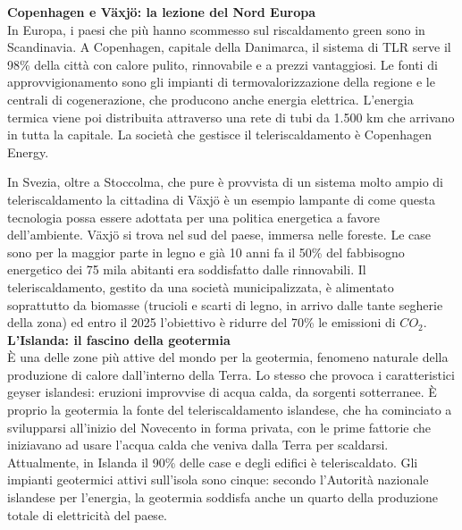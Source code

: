 \documentclass[laurea,oneside,11pt]{USiena_tesiLM}
\begin{document}
\noindent\textbf{Copenhagen e Växjö: la lezione del Nord Europa}\\
\noindent In Europa, i paesi che più hanno scommesso sul riscaldamento green sono in Scandinavia. A Copenhagen, capitale della Danimarca, il sistema di TLR serve il 98\% della città con calore pulito, rinnovabile e a prezzi vantaggiosi. Le fonti di approvvigionamento sono gli impianti di termovalorizzazione della regione e le centrali di cogenerazione, che producono anche energia elettrica. L'energia termica viene poi distribuita attraverso una rete di tubi da 1.500 km che arrivano in tutta la capitale. La società che gestisce il teleriscaldamento è Copenhagen Energy.

In Svezia, oltre a Stoccolma, che pure è provvista di un sistema molto ampio di teleriscaldamento la cittadina di Växjö è un esempio lampante di come questa tecnologia possa essere adottata  per una politica energetica a favore dell'ambiente. Växjö si trova nel sud del paese, immersa nelle foreste. Le case sono per la maggior parte in legno e già 10 anni fa il 50\% del fabbisogno energetico dei 75 mila abitanti era soddisfatto dalle rinnovabili. Il teleriscaldamento, gestito da una società municipalizzata, è alimentato soprattutto da biomasse (trucioli e scarti di legno, in arrivo dalle tante segherie della zona) ed entro il 2025 l'obiettivo è ridurre del 70\% le emissioni di $CO_2$.\\

\noindent\textbf{L’Islanda: il fascino della geotermia}\\
\noindent \`E una delle zone più attive del mondo per la geotermia, fenomeno naturale della produzione di calore dall'interno della Terra. Lo stesso che provoca i caratteristici geyser islandesi: eruzioni improvvise di acqua calda, da sorgenti sotterranee. \`E proprio la geotermia la fonte del teleriscaldamento islandese, che ha cominciato a svilupparsi all'inizio del Novecento in forma privata, con le prime fattorie che iniziavano ad usare l'acqua calda che veniva dalla Terra per scaldarsi. Attualmente, in Islanda il 90\% delle case e degli edifici è teleriscaldato. Gli impianti geotermici attivi sull'isola sono cinque: secondo l'Autorità nazionale islandese per l'energia, la geotermia soddisfa anche un quarto della produzione totale di elettricità del paese.\\
\end{document}
